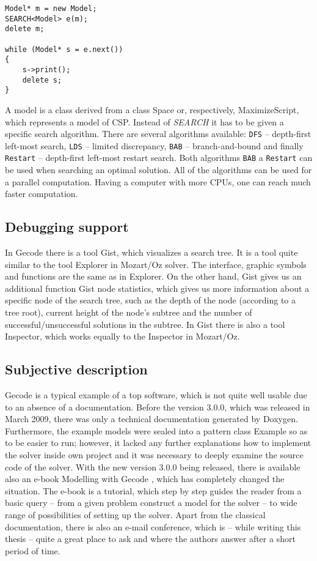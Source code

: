 \begin{verbatim}
Model* m = new Model;	
SEARCH<Model> e(m);
delete m;

while (Model* s = e.next())
{
	s->print();
	delete s;
}  
\end{verbatim}

A model is a class derived from a class Space or, respectively, MaximizeScript, which
represents a model of CSP. Instead of {\em SEARCH} it has to be given a specific search
algorithm. There are several algorithms available: \texttt{DFS} -- depth-first left-most search, \texttt{LDS} -- limited discrepancy,
\texttt{BAB} -- branch-and-bound and finally \texttt{Restart} -- depth-first left-most
restart search. Both algorithms \texttt{BAB} a \texttt{Restart} can be used when 
searching an optimal solution. All of the algorithms can be used for a parallel computation.
Having a computer with more CPUs, one can reach much faster computation.

\subsection{Debugging support}
In Gecode there is a tool Gist, which visualizes a search tree. It is a tool quite 
similar to the tool Explorer in Mozart/Oz solver. The interface, graphic symbols and
functions are the same as in Explorer. On the other hand, Gist gives us an additional 
function Gist node statistics, which gives us more information about a specific node 
of the search tree, such as the depth of the node (according to a tree root), current height
of the node's subtree and the number of successful/unsuccessful solutions in the subtree.
In Gist there is also a tool Inspector, which works equally to the Inspector in Mozart/Oz.
   

\subsection{Subjective description}
Gecode is a typical example of a top software, which is not quite well usable due to
an absence of a documentation. Before the version 3.0.0, which was released in March 2009, there
was only a technical documentation generated by Doxygen. Furthermore, the example models were 
sealed into a pattern class Example so as to be easier to run; however, it lacked any further 
explanations how to implement the solver inside own project and it was necessary to deeply
examine the source code of the solver. With the new version 3.0.0 being released, there is
available also an e-book Modelling with Gecode \cite{gecode:modelling}, which has completely changed
the situation. The e-book is a tutorial, which step by step guides the reader from a basic 
query -- from a given problem construct a model for the solver -- to wide range of possibilities
of setting up the solver. Apart from the classical documentation, there is also an e-mail conference,
which is -- while writing this thesis -- quite a great place to ask and where the authors
answer after a short period of time.
